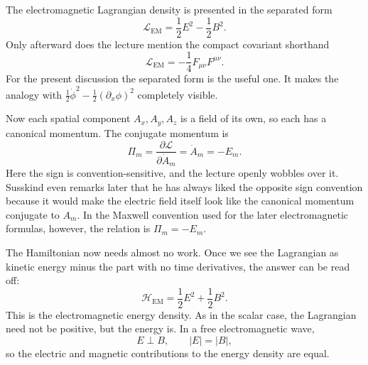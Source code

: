 The electromagnetic Lagrangian density is presented in the separated form
\begin{equation}
\mathcal L_{\mathrm{EM}}=\frac12E^2-\frac12B^2.
\end{equation}
Only afterward does the lecture mention the compact covariant shorthand
\begin{equation}
\mathcal L_{\mathrm{EM}}=-\frac14F_{\mu\nu}F^{\mu\nu}.
\end{equation}
For the present discussion the separated form is the useful one. It makes the analogy with
\(\frac12\dot\phi^2-\frac12(\partial_x\phi)^2\) completely visible.

Now each spatial component \(A_x,A_y,A_z\) is a field of its own, so each has a canonical momentum. The conjugate momentum is
\begin{equation}
\Pi_m=\frac{\partial\mathcal L}{\partial \dot A_m}=\dot A_m=-E_m.
\end{equation}
Here the sign is convention-sensitive, and the lecture openly wobbles over it. Susskind even remarks later that he has always liked the opposite sign convention because it would make the electric field itself look like the canonical momentum conjugate to \(A_m\). In the Maxwell convention used for the later electromagnetic formulas, however, the relation is \(\Pi_m=-E_m\).

The Hamiltonian now needs almost no work. Once we see the Lagrangian as kinetic energy minus the part with no time derivatives, the answer can be read off:
\begin{equation}
\mathcal H_{\mathrm{EM}}=\frac12E^2+\frac12B^2.
\end{equation}
This is the electromagnetic energy density. As in the scalar case, the Lagrangian need not be positive, but the energy is. In a free electromagnetic wave,
\begin{equation}
E\perp B,
\qquad
|E|=|B|,
\end{equation}
so the electric and magnetic contributions to the energy density are equal.

